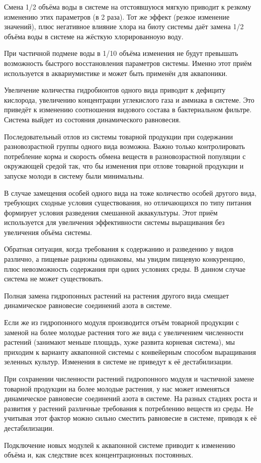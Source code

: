 Смена 1/2 объёма воды в системе на отстоявшуюся мягкую приводит к резкому изменению этих параметров (в 2 раза). Тот же эффект (резкое изменение значений), плюс негативное влияние хлора на биоту системы даёт замена 1/2 объёма воды в системе на жёсткую хлорированноую воду.

При частичной подмене воды в 1/10 объёма изменения не будут превышать возможность быстрого восстановления параметров системы. Именно этот приём используется в аквариумистике и может быть применён для аквапоники.

Увеличение количества гидробионтов одного вида приводит к дефициту кислорода, увеличению концентрации углекислого газа и аммиака в системе. Это приведёт к изменению соотношения видового состава в бактериальном фильтре. Система выйдет из состояния динамического равновесия.

Последовательный отлов из системы товарной продукции при содержании разновозрастной группы одного вида возможна. Важно только контролировать потребление корма и скорость обмена веществ в разновозрастной популяции с окружающей средой так, что бы изменения при отлове товарной продукции и запуске молоди в систему были минимальны.

В случае замещения особей одного вида на тоже количество особей другого вида, требующих сходные условия существования, но отличающихся по типу питания формирует условия разведения смешанной аквакультуры. Этот приём используется для увеличения эффективности системы выращивания без увеличения объёма системы. 

Обратная ситуация, когда требования к содержанию и разведению у видов различно, а пищевые рационы одинаковы, мы увидим пищевую конкуренцию, плюс невозможность содержания при одних условиях среды. В данном случае система не может существовать.

Полная замена гидропонных растений на растения другого вида смещает динамическое равновесие соединений азота в системе.

Если же из гидропонного модуля производится отъём товарной продукции с заменой на более молодые растения того же вида с увеличением численности растений (занимают меньше площадь, хуже развита корневая система), мы приходим к варианту аквапонной системы с конвейерным способом выращивания зеленных культур. Изменения в системе не приведут к её дестабилизации.

При сохранении численности растений гидропонного модуля и частичной замене товарной продукции на более молодые растения, у нас может изменяться динамическое равновесие соединений азота в системе. На разных стадиях роста и развития у растений различные требования к потреблению веществ из среды. Не учитывая этот фактор можно сильно сместить равновесие в системе, приводя к её дестабилизации.

Подключение новых модулей к аквапонной системе приводит к изменению объёма и, как следствие всех концентрационных постоянных.

